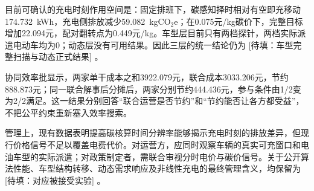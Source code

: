 \documentclass{setp-new}
\DeclareRobustCommand{\TBD}[1]{%
  \begingroup\setlength{\fboxsep}{1.2pt}%
  \colorbox{black!12}{\textcolor{black!65}{\textsf{\footnotesize[待填：#1]}}}%
  \endgroup}
\begin{document}
目前可确认的充电时刻作用空间是：固定排班下，碳感知择时相对有空即充移动174.732~kWh，充电侧排放减少59.082~kgCO$_2$e；在0.075元/kg碳价下，完整目标增加22.094元，配对翻转点为0.449元/kg。车型层目前只有两档探针，两档实际派遣电动车均为0；动态层没有可用结果。因此三层的统一结论仍为\TBD{车型完整扫描与动态正式结果}。

协同效率批显示，两家单干成本之和3922.079元，联合成本3033.206元，节约888.873元；同一联合解事后分摊后，两家分别节约444.436元，参与条件由1/2变为2/2满足。这一结果分别回答“联合运营是否节约”和“节约能否让各方都受益”，不把公平约束重新塞入效率搜索。

管理上，现有数据表明提高碳核算时间分辨率能够揭示充电时刻的排放差异，但现行价格信号不足以覆盖电费代价。对运营方，应同时观察车辆的真实可充窗口和电油车型的实际派遣；对政策制定者，需联合审视分时电价与碳价信号。关于公开算法性能、车型结构转移、动态需求响应及非线性充电的最终管理含义，均保留为\TBD{对应被接受实验}。
\end{document}
